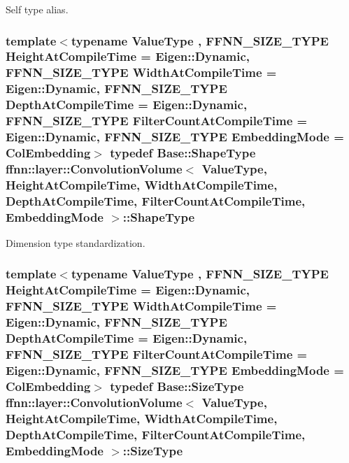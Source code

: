 Self type alias. 

\hypertarget{classffnn_1_1layer_1_1_convolution_volume_abd66a08414e0b2892f30f4afd32f7e30}{
\subsubsection[{Shape\-Type}]{\setlength{\rightskip}{0pt plus 5cm}template$<$typename Value\-Type , F\-F\-N\-N\-\_\-\-S\-I\-Z\-E\-\_\-\-T\-Y\-P\-E Height\-At\-Compile\-Time = Eigen\-::\-Dynamic, F\-F\-N\-N\-\_\-\-S\-I\-Z\-E\-\_\-\-T\-Y\-P\-E Width\-At\-Compile\-Time = Eigen\-::\-Dynamic, F\-F\-N\-N\-\_\-\-S\-I\-Z\-E\-\_\-\-T\-Y\-P\-E Depth\-At\-Compile\-Time = Eigen\-::\-Dynamic, F\-F\-N\-N\-\_\-\-S\-I\-Z\-E\-\_\-\-T\-Y\-P\-E Filter\-Count\-At\-Compile\-Time = Eigen\-::\-Dynamic, F\-F\-N\-N\-\_\-\-S\-I\-Z\-E\-\_\-\-T\-Y\-P\-E Embedding\-Mode = Col\-Embedding$>$ typedef {\bf Base\-::\-Shape\-Type} {\bf ffnn\-::layer\-::\-Convolution\-Volume}$<$ Value\-Type, Height\-At\-Compile\-Time, Width\-At\-Compile\-Time, Depth\-At\-Compile\-Time, Filter\-Count\-At\-Compile\-Time, {\bf Embedding\-Mode} $>$\-::{\bf Shape\-Type}}}\label{classffnn_1_1layer_1_1_convolution_volume_abd66a08414e0b2892f30f4afd32f7e30}


Dimension type standardization. 

\hypertarget{classffnn_1_1layer_1_1_convolution_volume_a1ca8d2a6071885cf033b006b8a514452}{
\subsubsection[{Size\-Type}]{\setlength{\rightskip}{0pt plus 5cm}template$<$typename Value\-Type , F\-F\-N\-N\-\_\-\-S\-I\-Z\-E\-\_\-\-T\-Y\-P\-E Height\-At\-Compile\-Time = Eigen\-::\-Dynamic, F\-F\-N\-N\-\_\-\-S\-I\-Z\-E\-\_\-\-T\-Y\-P\-E Width\-At\-Compile\-Time = Eigen\-::\-Dynamic, F\-F\-N\-N\-\_\-\-S\-I\-Z\-E\-\_\-\-T\-Y\-P\-E Depth\-At\-Compile\-Time = Eigen\-::\-Dynamic, F\-F\-N\-N\-\_\-\-S\-I\-Z\-E\-\_\-\-T\-Y\-P\-E Filter\-Count\-At\-Compile\-Time = Eigen\-::\-Dynamic, F\-F\-N\-N\-\_\-\-S\-I\-Z\-E\-\_\-\-T\-Y\-P\-E Embedding\-Mode = Col\-Embedding$>$ typedef {\bf Base\-::\-Size\-Type} {\bf ffnn\-::layer\-::\-Convolution\-Volume}$<$ Value\-Type, Height\-At\-Compile\-Time, Width\-At\-Compile\-Time, Depth\-At\-Compile\-Time, Filter\-Count\-At\-Compile\-Time, {\bf Embedding\-Mode} $>$\-::{\bf Size\-Type}}}\label{classffnn_1_1layer_1_1_convolution_volume_a1ca8d2a6071885cf033b006b8a514452}


